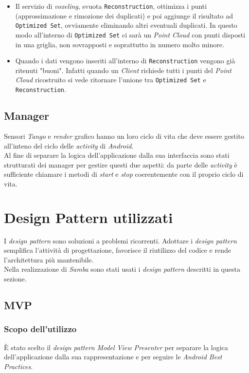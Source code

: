 \begin{itemize}
	\item Il servizio di \emph{voxeling}, svuota \texttt{Reconstruction}, ottimizza i punti (approssimazione e rimozione dei duplicati) e poi aggiunge il risultato ad \texttt{Optimized Set}, ovviamente eliminando altri eventuali duplicati. In questo modo all'interno di \texttt{Optimized Set} ci sarà un \emph{Point Cloud} con punti disposti in una griglia, non sovrapposti e soprattutto in numero molto minore.
	\item Quando i dati vengono inseriti all'interno di \texttt{Reconstruction} vengono già ritenuti "buoni". Infatti quando un \emph{Client} richiede tutti i punti del \emph{Point Cloud} ricostruito si vede ritornare l'unione tra \texttt{Optimized Set} e   \texttt{Reconstruction}.
\end{itemize}

\subsection{Manager}
Sensori \emph{Tango} e \emph{render} grafico hanno un loro ciclo di vita che deve essere gestito all'inteno del ciclo delle \emph{activity} di \emph{Android}.\\
Al fine di separare la logica dell'applicazione dalla sua interfaccia sono stati strutturati dei manager per gestire questi due aspetti: da parte delle \emph{activity} è sufficiente chiamare i metodi di \emph{start} e \emph{stop} coerentemente con il proprio ciclo di vita.\\

\newpage
\section{Design Pattern utilizzati}
I \emph{design pattern} sono soluzioni a problemi ricorrenti. Adottare i \emph{design pattern} semplifica
l'attività di progettazione, favorisce il riutilizzo del codice e rende l'architettura
più mantenibile.\\
Nella realizzazione di \emph{Samba} sono stati usati i \emph{design pattern} descritti in questa sezione.

\subsection{MVP}
\subsubsection{Scopo dell'utilizzo}
È stato scelto il \emph{design pattern} \emph{Model View Presenter} per separare la logica dell'applicazione dalla sua rappresentazione e per seguire le \emph{Android Best Practices}.
